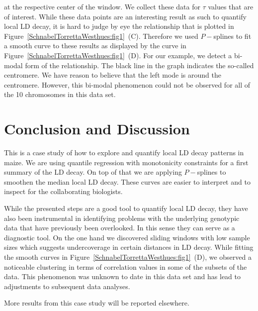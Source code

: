 \documentclass[twoside]{report}
\begin{document}
	at the respective center of the window. We collect these data for  
	$\tau$ values that are of interest. While these data points are an interesting result as
	such to quantify local LD decay, it is hard to judge by eye the relationship that is plotted in 
	Figure~\ref{SchnabelTorrettaWesthues:fig1}~(C). 
	Therefore we used $P-$splines to fit a smooth curve to these results as 
	displayed by the curve in Figure~\ref{SchnabelTorrettaWesthues:fig1}~(D). 
	For our example, we detect a bi-modal form of the 
	relationship. The black line in the graph indicates the so-called centromere. 
	We have reason to believe that the left mode is around the centromere.   
	However, this bi-modal phenomenon could not be observed for 
	all of the 10 chromosomes in this data set.   

\section{Conclusion and Discussion}
This is a case study of how to explore and quantify local LD decay patterns in maize. We are using
quantile regression with monotonicity constraints for a first summary of the LD decay. 
On top of that we are applying $P-$splines to smoothen the median local LD decay. These curves 
are easier to interpret and to inspect for the collaborating biologists. 

While the presented steps are a good tool to quantify local LD decay, they have also been 
	instrumental in identifying problems with the underlying genotypic 
	data that have previously been 
	overlooked. In this sense they can serve as a diagnostic tool. 
	On the one hand we discovered sliding windows with low sample sizes which suggests 
	undercoverage in certain distances in LD decay. 
	While fitting the smooth curves in Figure~\ref{SchnabelTorrettaWesthues:fig1}~(D), we 
	observed a noticeable clustering 
	in terms of correlation values in some of the subsets of the data. This phenomenon was unknown 
	to date in this data set and has lead to adjustments to subsequent data analyses. 
	
More results from this case study will be reported elsewhere.
\end{document}
